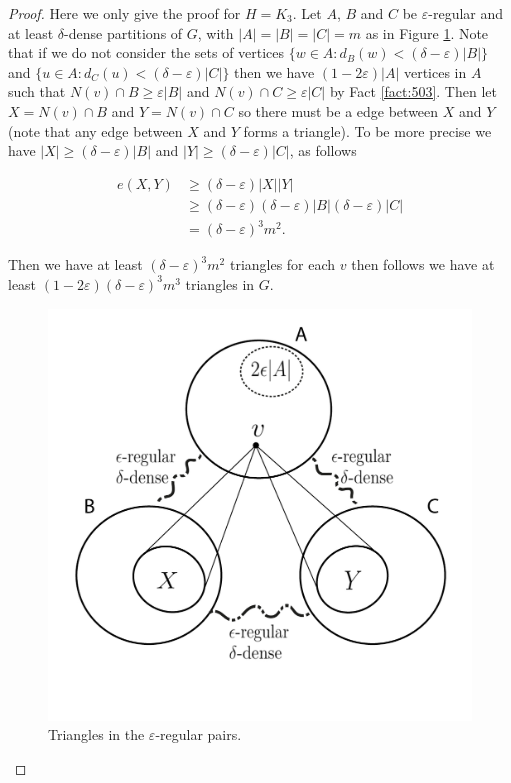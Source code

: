 \documentclass[12pt,twoside,a4paper,bibliography=totocnumbered]{book}
\numberwithin{equation}{section}
\theoremstyle{remark}
\begin{document}
\begin{proof}
Here we only give the proof for $H=K_3$. Let %
 $A$, $B$ and $C$ be $\varepsilon$-regular and at least $\delta$-dense partitions of $G$, with $|A|=|B|=|C|=m$ as in Figure \ref{fig:embeddinglemma}. Note that if we do not consider the sets of vertices $\{w\in A \colon d_B(w) < (\delta - \varepsilon)|B| \}$  and $\{u\in A \colon d_C(u) < (\delta - \varepsilon)|C| \}$ then we have $(1-2\varepsilon)|A|$ vertices in $A$ such that $N(v) \cap B \geq \varepsilon |B|$ and $N(v) \cap C \geq \varepsilon |C|$ by Fact \ref{fact:503}. Then let $X = N(v) \cap B$ and $Y =N(v) \cap C$ so there must be a edge between $X$ and $Y$ (note that any edge between $X$ and $Y$ forms a triangle). To be more precise we have $|X| \geq (\delta - \varepsilon)|B|$ and $|Y| \geq (\delta - \varepsilon)|C|$, as follows

\begin{align*}
e(X,Y) &\geq (\delta - \varepsilon)|X||Y|\\
& \geq (\delta - \varepsilon)  (\delta - \varepsilon)|B|  (\delta - \varepsilon)|C|\\
& =  (\delta - \varepsilon)^3 m^2.
\end{align*}

Then we have at least $ (\delta - \varepsilon)^3 m^2$ triangles for each $v$ then follows we have at least $(1-2\varepsilon) (\delta-\varepsilon)^3 m^3$ triangles in $G$. 

\begin{figure}[H]
     \centering
     \includegraphics[scale=1]{Figuras/embedding-lemma.jpg}
     \caption{Triangles in the $\varepsilon$-regular pairs.}
     \label{fig:embeddinglemma}
\end{figure}

\end{proof}
\end{document}
